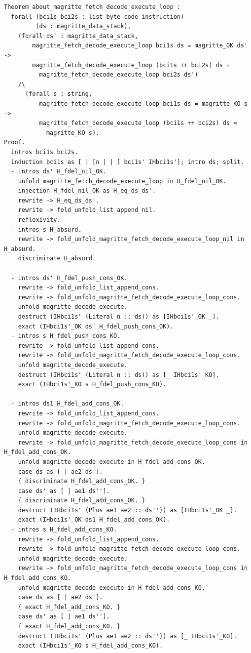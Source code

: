 \documentclass{article}
\begin{document}
\begin{lstlisting}
Theorem about_magritte_fetch_decode_execute_loop :
  forall (bci1s bci2s : list byte_code_instruction)
         (ds : magritte_data_stack),
    (forall ds' : magritte_data_stack,
        magritte_fetch_decode_execute_loop bci1s ds = magritte_OK ds' ->
        magritte_fetch_decode_execute_loop (bci1s ++ bci2s) ds =
          magritte_fetch_decode_execute_loop bci2s ds')
    /\
      (forall s : string,
          magritte_fetch_decode_execute_loop bci1s ds = magritte_KO s ->
          magritte_fetch_decode_execute_loop (bci1s ++ bci2s) ds =
            magritte_KO s).
Proof.
  intros bci1s bci2s.
  induction bci1s as [ | [n | | ] bci1s' IHbci1s']; intro ds; split.
  - intros ds' H_fdel_nil_OK.
    unfold magritte_fetch_decode_execute_loop in H_fdel_nil_OK.
    injection H_fdel_nil_OK as H_eq_ds_ds'.
    rewrite -> H_eq_ds_ds'.
    rewrite -> fold_unfold_list_append_nil.
    reflexivity.
  - intros s H_absurd.
    rewrite -> fold_unfold_magritte_fetch_decode_execute_loop_nil in H_absurd.
    discriminate H_absurd.
    
  - intros ds' H_fdel_push_cons_OK.
    rewrite -> fold_unfold_list_append_cons.
    rewrite -> fold_unfold_magritte_fetch_decode_execute_loop_cons.
    unfold magritte_decode_execute.
    destruct (IHbci1s' (Literal n :: ds)) as [IHbci1s'_OK _].
    exact (IHbci1s'_OK ds' H_fdel_push_cons_OK).
  - intros s H_fdel_push_cons_KO.
    rewrite -> fold_unfold_list_append_cons.
    rewrite -> fold_unfold_magritte_fetch_decode_execute_loop_cons.
    unfold magritte_decode_execute.
    destruct (IHbci1s' (Literal n :: ds)) as [_ IHbci1s'_KO].
    exact (IHbci1s'_KO s H_fdel_push_cons_KO).

  - intros ds1 H_fdel_add_cons_OK.
    rewrite -> fold_unfold_list_append_cons.
    rewrite -> fold_unfold_magritte_fetch_decode_execute_loop_cons.
    unfold magritte_decode_execute.
    rewrite -> fold_unfold_magritte_fetch_decode_execute_loop_cons in H_fdel_add_cons_OK.
    unfold magritte_decode_execute in H_fdel_add_cons_OK.
    case ds as [ | ae2 ds'].
    { discriminate H_fdel_add_cons_OK. }
    case ds' as [ | ae1 ds''].
    { discriminate H_fdel_add_cons_OK. }    
    destruct (IHbci1s' (Plus ae1 ae2 :: ds'')) as [IHbci1s'_OK _].
    exact (IHbci1s'_OK ds1 H_fdel_add_cons_OK).
  - intros s H_fdel_add_cons_KO.
    rewrite -> fold_unfold_list_append_cons.
    rewrite -> fold_unfold_magritte_fetch_decode_execute_loop_cons.
    unfold magritte_decode_execute.
    rewrite -> fold_unfold_magritte_fetch_decode_execute_loop_cons in H_fdel_add_cons_KO.
    unfold magritte_decode_execute in H_fdel_add_cons_KO.
    case ds as [ | ae2 ds'].
    { exact H_fdel_add_cons_KO. }
    case ds' as [ | ae1 ds''].
    { exact H_fdel_add_cons_KO. }    
    destruct (IHbci1s' (Plus ae1 ae2 :: ds'')) as [_ IHbci1s'_KO].
    exact (IHbci1s'_KO s H_fdel_add_cons_KO).
    

\end{lstlisting}
\end{document}
